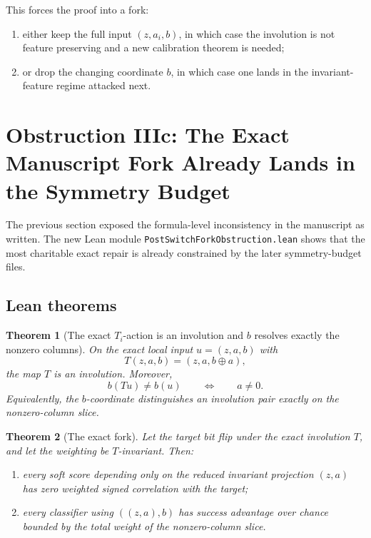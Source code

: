 \documentclass[11pt]{article}
\newtheorem{theorem}{Theorem}[section]
\theoremstyle{remark}
\begin{document}
This forces the proof into a fork:
\begin{enumerate}[leftmargin=1.5em]
  \item either keep the full input \((z,a_i,b)\), in which case the involution is not feature
  preserving and a new calibration theorem is needed;
  \item or drop the changing coordinate \(b\), in which case one lands in the invariant-feature
  regime attacked next.
\end{enumerate}

\section{Obstruction IIIc: The Exact Manuscript Fork Already Lands in the Symmetry Budget}

The previous section exposed the formula-level inconsistency in the manuscript as written.  The new
Lean module \texttt{PostSwitchForkObstruction.lean} shows that the most charitable exact repair is
already constrained by the later symmetry-budget files.

\subsection{Lean theorems}

\begin{theorem}[The exact \(T_i\)-action is an involution and \(b\) resolves exactly the nonzero columns]
On the exact local input \(u=(z,a,b)\) with
\[
  T(z,a,b) = (z,a,b \oplus a),
\]
the map \(T\) is an involution.  Moreover,
\[
  b(Tu) \neq b(u)
  \qquad\Longleftrightarrow\qquad
  a \neq 0.
\]
Equivalently, the \(b\)-coordinate distinguishes an involution pair exactly on the nonzero-column
slice.
\end{theorem}

\begin{theorem}[The exact fork]
Let the target bit flip under the exact involution \(T\), and let the weighting be \(T\)-invariant.
Then:
\begin{enumerate}[leftmargin=1.5em]
  \item every soft score depending only on the reduced invariant projection \((z,a)\) has zero
  weighted signed correlation with the target;
  \item every classifier using \(((z,a),b)\) has success advantage over chance bounded by the
  total weight of the nonzero-column slice.
\end{enumerate}
\end{theorem}
\end{document}
